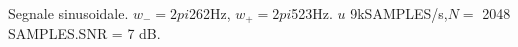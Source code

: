Segnale sinusoidale. $w_{-}=2pi$262Hz, $w_{+}=2pi$523Hz. $
u$ 9kSAMPLES/s,$N=$ 2048 SAMPLES.SNR = 7 dB.